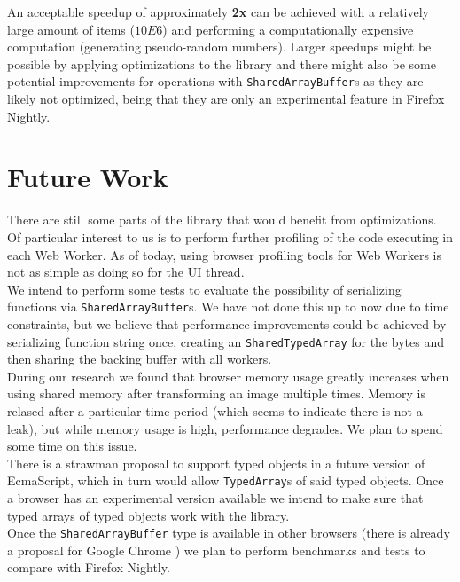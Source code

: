 \documentclass[runningheads,a4paper]{llncs}
\begin{document}
An acceptable speedup of approximately \textbf{2x} can be achieved with a relatively large amount of items (\(10E6\)) and performing a computationally expensive computation (generating pseudo-random numbers). Larger speedups might be possible by applying optimizations to the library and there might also be some potential improvements for operations with \verb+SharedArrayBuffer+s as they are likely not optimized, being that they are only an experimental feature in Firefox Nightly.

\section{Future Work}\label{sec:future}
There are still some parts of the library that would benefit from optimizations. Of particular interest to us is to perform further profiling of the code executing in each Web Worker. As of today, using browser profiling tools for Web Workers is not as simple as doing so for the UI thread.\\

We intend to perform some tests to evaluate the possibility of serializing functions via \verb+SharedArrayBuffer+s. We have not done this up to now due to time constraints, but we believe that performance improvements could be achieved by serializing function string once, creating an \verb+SharedTypedArray+ for the bytes and then sharing the backing buffer with all workers.\\

During our research we found that browser memory usage greatly increases when using shared memory after transforming an image multiple times. Memory is relased after a particular time period (which seems to indicate there is not a leak), but while memory usage is high, performance degrades. We plan to spend some time on this issue.\\

There is a strawman proposal to support typed objects \cite{typed-objects} in a future version of EcmaScript, which in turn would allow \verb+TypedArray+s of said typed objects. Once a browser has an experimental version available we intend to make sure that typed arrays of typed objects work with the library.\\

Once the \verb+SharedArrayBuffer+ type is available in other browsers (there is already a proposal for Google Chrome \cite{sab-chrome}) we plan to perform benchmarks and tests to compare with Firefox Nightly.
\end{document}
